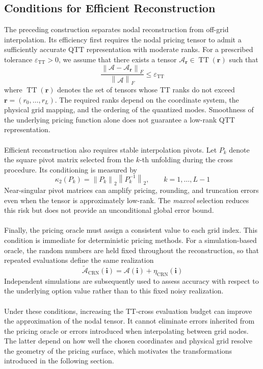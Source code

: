 \documentclass{article}
\numberwithin{equation}{subsection}
\theoremstyle{definition}
\theoremstyle{remark}
\begin{document}
\subsection{Conditions for Efficient Reconstruction}
\label{subsec:reconstruction-conditions}
The preceding construction separates nodal reconstruction from off-grid
interpolation. Its efficiency first requires the nodal pricing tensor to admit
a sufficiently accurate QTT representation with moderate ranks. For a
prescribed tolerance \(\varepsilon_{\mathrm{TT}}>0\), we assume that there
exists a tensor
\(\mathcal{A}_{\boldsymbol{r}}\in\operatorname{TT}(\boldsymbol{r})\) such that
\begin{equation}
\frac{
\left\|
\mathcal{A}-\mathcal{A}_{\boldsymbol{r}}
\right\|_F
}{
\left\|\mathcal{A}\right\|_F
}
\leq
\varepsilon_{\mathrm{TT}}
\end{equation}
where \(\operatorname{TT}(\boldsymbol{r})\) denotes the set of tensors whose TT
ranks do not exceed
\(\boldsymbol{r}=(r_0,\ldots,r_L)\). The required ranks depend on the coordinate
system, the physical grid mapping, and the ordering of the quantized modes.
Smoothness of the underlying pricing function alone does not guarantee a
low-rank QTT representation.\\
\\
Efficient reconstruction also requires stable interpolation pivots. Let \(P_k\)
denote the square pivot matrix selected from the \(k\)-th unfolding during the
cross procedure. Its conditioning is measured by
\begin{equation}
\kappa_2(P_k)
=
\left\|P_k\right\|_2
\left\|P_k^{-1}\right\|_2,
\qquad
k=1,\ldots,L-1
\end{equation}
Near-singular pivot matrices can amplify pricing, rounding, and truncation
errors even when the tensor is approximately low-rank. The \emph{maxvol}
selection reduces this risk but does not provide an unconditional global error
bound. \\
\\
Finally, the pricing oracle must assign a consistent value to each grid index.
This condition is immediate for deterministic pricing methods. For a
simulation-based oracle, the random numbers are held fixed throughout the
reconstruction, so that repeated evaluations define the same realization
\begin{equation}
\widetilde{\mathcal{A}}_{\mathrm{CRN}}(\boldsymbol{i})
=
\mathcal{A}(\boldsymbol{i})
+
\eta_{\mathrm{CRN}}(\boldsymbol{i})
\end{equation}
Independent simulations are subsequently used to assess accuracy with respect
to the underlying option value rather than to this fixed noisy realization.\\
\\
Under these conditions, increasing the TT-cross evaluation budget can improve
the approximation of the nodal tensor. It cannot eliminate errors inherited
from the pricing oracle or errors introduced when interpolating between grid
nodes. The latter depend on how well the chosen coordinates and physical grid
resolve the geometry of the pricing surface, which motivates the transformations
introduced in the following section.
\end{document}
